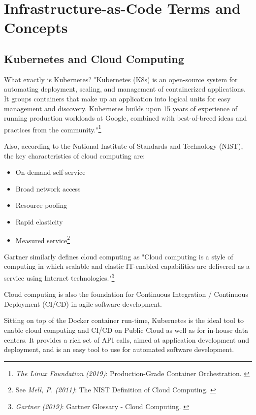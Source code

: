 %
%

\pagebreak
\section{Infrastructure-as-Code Terms and Concepts}

\onehalfspacing

\subsection{Kubernetes and Cloud Computing}

What exactly is Kubernetes? "Kubernetes (K8s) is an open-source system for automating deployment, scaling, and management of containerized applications.
It groups containers that make up an application into logical units for easy management and discovery. Kubernetes builds upon 15 years of experience of running production workloads at Google, combined with best-of-breed ideas and practices from the community."\footnote{\textit{The Linux Foundation (2019)}: Production-Grade Container Orchestration. \cite{kubernetes}}

Also, according to the National Institute of Standards and Technology (NIST), the key characteristics of cloud computing are: 
\begin{itemize}
\item On-demand self-service
\item Broad network access
\item Resource pooling
\item Rapid elasticity
\item Measured service\footnote{See \textit{Mell, P. (2011)}: The NIST Definition of Cloud Computing. \cite{sp800-145}}
\end{itemize}

Gartner similarly defines cloud computing as "Cloud computing is a style of computing in which scalable and elastic IT-enabled capabilities are delivered as a service using Internet technologies."\footnote{\textit{Gartner (2019)}: Gartner Glossary - Cloud Computing. \cite{gartnerGlossary}}

Cloud computing is also the foundation for Continuous Integration / Continuous Deployment (CI/CD) in agile software development.

Sitting on top of the Docker container run-time, Kubernetes is the ideal tool to enable cloud computing and CI/CD on Public Cloud as well as for in-house data centers. It provides a rich set of API calls, aimed at application development and deployment, and is an easy tool to use for automated software development.


